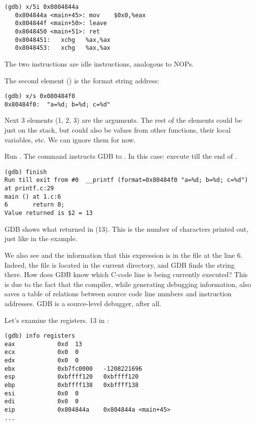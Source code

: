 \begin{lstlisting}[label=NOP_as_XCHG_example,style=customasmx86]
(gdb) x/5i 0x0804844a
   0x804844a <main+45>:	mov    $0x0,%eax
   0x804844f <main+50>:	leave  
   0x8048450 <main+51>:	ret    
   0x8048451:	xchg   %ax,%ax
   0x8048453:	xchg   %ax,%ax
\end{lstlisting}

The two  instructions are idle instructions, analogous to \ac{NOP}s.

The second element () is the format string address:

\begin{lstlisting}
(gdb) x/s 0x080484f0
0x80484f0:	"a=%d; b=%d; c=%d"
\end{lstlisting}

Next 3 elements (1, 2, 3) are the \printf arguments.
The rest of the elements could be just  on the stack, 
but could also be values from other functions, their local variables, etc.
We can ignore them for now.

Run . 
The command instructs GDB to .
In this case: execute till the end of \printf.

\begin{lstlisting}
(gdb) finish
Run till exit from #0  __printf (format=0x80484f0 "a=%d; b=%d; c=%d") at printf.c:29
main () at 1.c:6
6		return 0;
Value returned is $2 = 13
\end{lstlisting}

\ac{GDB} shows what \printf returned in \EAX (13).
This is the number of characters printed out, just like in the \olly example.

We also see  and the information that this expression is in the  file at the line 6.
Indeed, the  file is located in the current directory, and \ac{GDB} finds the string there.
How does \ac{GDB} know which C-code line is being currently executed?
This is due to the fact that the compiler,
while generating debugging information, also saves a table of relations between source code line
numbers and instruction addresses.
GDB is a source-level debugger, after all.

Let's examine the registers.
13 in \EAX:

\begin{lstlisting}
(gdb) info registers
eax            0xd	13
ecx            0x0	0
edx            0x0	0
ebx            0xb7fc0000	-1208221696
esp            0xbffff120	0xbffff120
ebp            0xbffff138	0xbffff138
esi            0x0	0
edi            0x0	0
eip            0x804844a	0x804844a <main+45>
...
\end{lstlisting}

